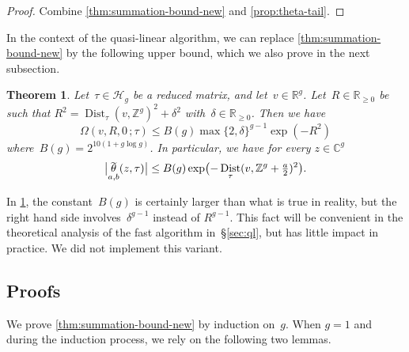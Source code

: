 \documentclass[12pt,oneside]{amsart}
\numberwithin{equation}{section}
\newtheorem{thm}[equation]{Theorem}
\theoremstyle{definition}
\newcommand{\Z}{\mathbb{Z}}
\newcommand{\R}{\mathbb{R}}
\newcommand{\C}{\mathbb{C}}
\newcommand{\Half}{\mathcal{H}}
\newcommand{\tailsum}[4]{\ensuremath{\Omega(#1,#2,#3\,;#4)}}
\DeclareMathOperator{\Dist}{Dist}
\DeclareMathOperator{\thetatilde}{\rlap{\raisebox{-0.1ex}{$\widetilde{\phantom{\,t}}$}}\theta}
\DeclarePairedDelimiter{\abs}{|}{|}
\DeclarePairedDelimiter{\paren}{(}{)}
\begin{document}
\begin{proof}
  Combine \cref{thm:summation-bound-new} and \cref{prop:theta-tail}.
\end{proof}

In the context of the quasi-linear algorithm, we can replace
\cref{thm:summation-bound-new} by the following upper bound, which we also
prove in the next subsection.

\begin{thm}
  \label{thm:shifted-ubound}
  Let~$\tau\in \Half_g$ be a reduced matrix, and
  let~$v\in \R^g$.  Let~$R\in \R_{\geq 0}$ be such that
  $R^2 = \Dist_\tau(v, \Z^g)^2 + \delta^2$ with~$\delta \in \R_{\geq 0}$. Then
  we have
  \begin{displaymath}
    \tailsum{v}{R}{0}{\tau} \leq B(g) \max\{2,\delta\}^{g-1} \exp(-R^2)
  \end{displaymath}
  where~$B(g) = 2^{10(1 + g\log g)}$. In particular, we have
  for every $z\in \C^g$
  \begin{displaymath}
    \abs[\big]{\thetatilde_{a,b}(z,\tau)} \leq B(g) \exp\paren[\big]{-\Dist_\tau(v,\Z^g + \tfrac a2)^2}.
  \end{displaymath}
\end{thm}

In \cref{thm:shifted-ubound}, the constant~$B(g)$ is certainly larger than what
is true in reality, but the right hand side involves~$\delta^{g-1}$ instead of
$R^{g-1}$. This fact will be convenient in the theoretical analysis of the fast
algorithm in~§\ref{sec:ql}, but has little impact in practice. We did not
implement this variant.

\subsection{Proofs}
\label{subsec:tailsum-proof}

We prove \cref{thm:summation-bound-new} by induction on~$g$. When $g=1$
and during the induction process, we rely on the following two lemmas.
\end{document}
